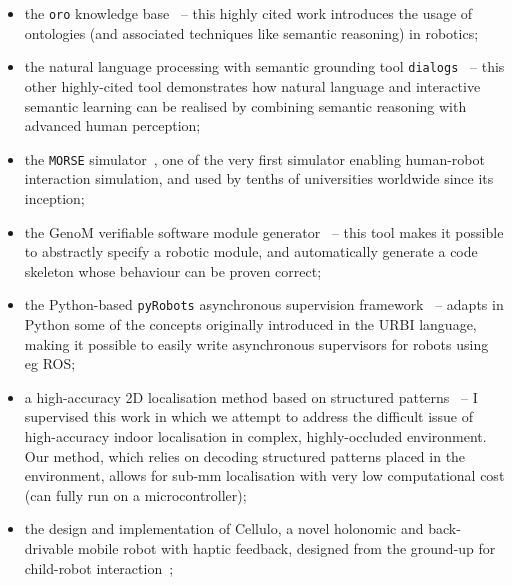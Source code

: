 \begin{itemize}
    \item the \texttt{oro} knowledge base~\autocite{lemaignan2010oro} --
        this highly cited work introduces the usage of ontologies (and
        associated techniques like semantic reasoning) in robotics;

    \item the natural language processing with semantic grounding tool
        \texttt{dialogs}~\autocite{lemaignan2011grounding} -- this other
        highly-cited tool demonstrates how natural language and interactive
        semantic learning can be realised by combining semantic reasoning with
        advanced human perception;

    \item the \texttt{MORSE} simulator~\autocite{echeverria2011morse,
        lemaignan2012morse}, one of the very first simulator enabling
        human-robot interaction simulation, and used by tenths of universities
        worldwide since its inception;

    \item the GenoM verifiable software module
        generator~\autocite{mallet2010genom3} -- this tool makes it possible to
        abstractly specify a robotic module, and automatically generate a code
        skeleton whose behaviour can be proven correct;

    \item the Python-based \texttt{pyRobots} asynchronous supervision
        framework~\autocite{lemaignan2015pyrobots} -- adapts in Python some of the concepts
        originally introduced in the URBI language, making it possible to
        easily write asynchronous supervisors for robots using eg ROS;

    \item a high-accuracy 2D localisation method based on structured
        patterns~\autocite{hostettler2016realtime} -- I supervised this work
        in which we attempt to address the difficult issue of high-accuracy
        indoor localisation in complex, highly-occluded environment. Our method,
        which relies on decoding structured patterns placed in the environment,
        allows for sub-mm localisation with very low computational cost (can
        fully run on a microcontroller);

    \item the design and implementation of Cellulo, a novel holonomic and
        back-drivable mobile robot with haptic feedback, designed from the
        ground-up for child-robot
        interaction~\cite{ozgur2016permanent,ozgur2017cellulo};


\end{itemize}
